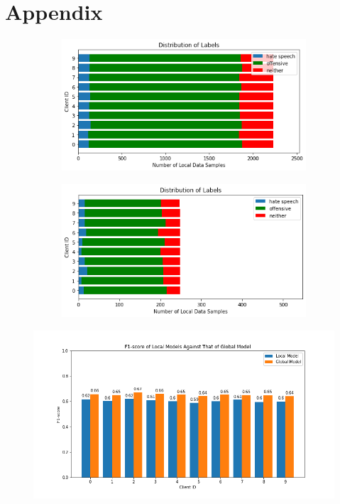 \documentclass[letterpaper]{article} %
\begin{document}
\clearpage
\section{Appendix}

\begin{figure}[hbt!]

\begin{subfigure}{\columnwidth}
{\includegraphics[width=\columnwidth]{iid_distribution_of_labels_7}}
\caption{}
\end{subfigure}%

\begin{subfigure}{\columnwidth}
{\includegraphics[width=\columnwidth]{iid_test_set_distribution_of_labels_7}}
\caption{}
\end{subfigure}

\caption{}
\end{figure}

\begin{figure}[hbt!]
{\includegraphics[width=\columnwidth]{iid_seed_7performance_of_models_on_client_data_f1score}}
\caption{}
\end{figure}
\end{document}
